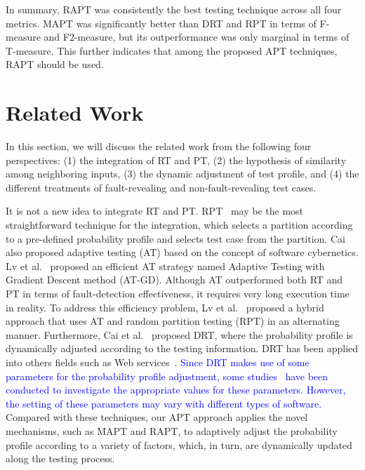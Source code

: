 \documentclass[10pt,journal,compsoc]{IEEEtran}
\begin{document}
In summary, RAPT was consistently the best testing technique across all four metrics. MAPT was significantly better than DRT and RPT in terms of F-measure and F2-measure, but its outperformance was only marginal in terms of T-measure. This further indicates that among the proposed APT techniques, RAPT should be used.

\section{Related Work}
\label{sec:related}

In this section, we will discuss the related work from the following four perspectives: (1) the integration of RT and PT, (2) the hypothesis of similarity among neighboring inputs, (3) the dynamic adjustment of test profile, and (4) the different treatments of fault-revealing and non-fault-revealing test cases.

It is not a new idea to integrate RT and PT. RPT~\cite{Cai05, Cai07} may be the most straightforward technique for the integration, which selects a partition according to a pre-defined probability profile and selects test case from the partition. Cai~\cite{Cai02} also proposed adaptive testing (AT) based on the concept of software cybernetics. Lv et al.~\cite{LvTSE14} proposed an efficient AT strategy named Adaptive Testing with Gradient Descent method (AT-GD). Although AT outperformed both RT and PT in terms of fault-detection effectiveness, it requires very long execution time in reality. To address this efficiency problem, Lv et al.~\cite{Lv14} proposed a hybrid approach that uses AT and random partition testing (RPT) in an alternating manner. Furthermore, Cai et al.~\cite{Cai09} proposed DRT, where the probability profile is dynamically adjusted according to the testing information. DRT has been applied into others fields such as Web services~\cite{Sun12}. \textcolor{blue}{Since DRT makes use of some parameters for the probability profile adjustment, some studies~\cite{Lv11, Yang14, Li15} have been conducted to investigate the appropriate values for these parameters. However, the setting of these parameters may vary with different types of software.}
Compared with these techniques, our APT approach applies the novel mechanisms, such as MAPT and RAPT, to adaptively adjust the probability profile according to a variety of factors, which, in turn, are dynamically updated along the testing process.
\end{document}
